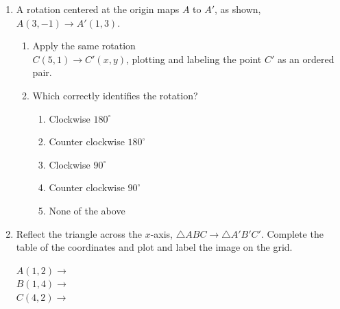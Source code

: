 \documentclass[12pt, twoside]{article}
\begin{document}
\begin{enumerate}
\newpage
\item A rotation centered at the origin maps $A$ to $A'$, as shown, $A(3,-1) \rightarrow A'(1,3)$.
\begin{multicols}{2}
  \begin{enumerate}
    \item Apply the same rotation \\
    $C(5,1)\rightarrow C'(x,y)$, plotting and labeling the point $C'$ as an ordered pair.
    \item Which correctly identifies the rotation?
    \begin{enumerate}[label=(\Alph*)]
      \item Clockwise $180^\circ$
      \item Counter clockwise $180^\circ$
      \item Clockwise $90^\circ$
      \item Counter clockwise $90^\circ$
      \item None of the above
    \end{enumerate} \vspace{2cm}
    \end{enumerate}
    \begin{flushright}
    \end{flushright}
\end{multicols}

\newpage
\item Reflect the triangle across the $x$-axis, $\triangle ABC \rightarrow \triangle A'B'C'$. Complete the table of the coordinates and plot and label the image on the grid. \vspace{0.5cm}
\begin{multicols}{2}
  $A(1,2) \rightarrow$ \\[0.7cm]
  $B(1,4) \rightarrow$ \\[0.7cm]
  $C(4,2) \rightarrow$ \\[0.7cm]
  \end{multicols}


\end{enumerate}
\end{document}
